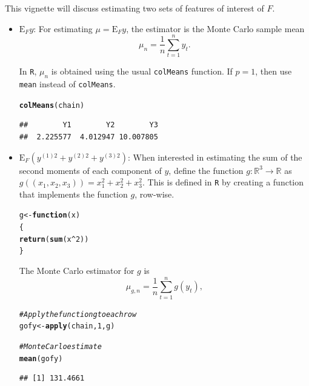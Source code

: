 \documentclass[11pt]{article}\usepackage[]{graphicx}\usepackage[]{color}
\makeatletter
\newcommand{\hlnum}[1]{\textcolor[rgb]{0.686,0.059,0.569}{#1}}%
\newcommand{\hlcom}[1]{\textcolor[rgb]{0.678,0.584,0.686}{\textit{#1}}}%
\newcommand{\hlopt}[1]{\textcolor[rgb]{0,0,0}{#1}}%
\newcommand{\hlstd}[1]{\textcolor[rgb]{0.345,0.345,0.345}{#1}}%
\newcommand{\hlkwa}[1]{\textcolor[rgb]{0.161,0.373,0.58}{\textbf{#1}}}%
\newcommand{\hlkwb}[1]{\textcolor[rgb]{0.69,0.353,0.396}{#1}}%
\newcommand{\hlkwc}[1]{\textcolor[rgb]{0.333,0.667,0.333}{#1}}%
\newcommand{\hlkwd}[1]{\textcolor[rgb]{0.737,0.353,0.396}{\textbf{#1}}}%
\newenvironment{kframe}{%
 \def\at@end@of@kframe{}%
 \ifinner\ifhmode%
  \def\at@end@of@kframe{\end{minipage}}%
  \begin{minipage}{\columnwidth}%
 \fi\fi%
 \def\FrameCommand##1{\hskip\@totalleftmargin \hskip-\fboxsep
 \colorbox{shadecolor}{##1}\hskip-\fboxsep
     \hskip-\linewidth \hskip-\@totalleftmargin \hskip\columnwidth}%
 \MakeFramed {\advance\hsize-\width
   \@totalleftmargin\z@ \linewidth\hsize
   \@setminipage}}%
 {\par\unskip\endMakeFramed%
 \at@end@of@kframe}
\newenvironment{knitrout}{}{} %
\makeatother
\begin{document}
\bigskip
This vignette will discuss estimating two sets of features of interest of $F$.
\begin{itemize}
	\item $\text{E}_F y$: For estimating $\mu = \text{E}_Fy$, the estimator is the Monte Carlo sample mean
\[ \mu_n = \dfrac{1}{n} \displaystyle \sum_{t=1}^{n} y_t.\]

In \texttt{R}, $\mu_n$ is obtained using the usual \texttt{colMeans} function. If $p = 1$, then use \texttt{mean} instead of \texttt{colMeans}.

\begin{knitrout}
\color{fgcolor}\begin{kframe}
\begin{alltt}
 \hlkwd{colMeans}\hlstd{(chain)}
\end{alltt}
\begin{verbatim}
##        Y1        Y2        Y3 
##  2.225577  4.012947 10.007805
\end{verbatim}
\end{kframe}
\end{knitrout}

	\item $\text{E}_F \left(y^{(1)2} + y^{(2)2} + y^{(3)2} \right)$: When interested in estimating the sum of the second moments of each component of $y$,  define the function $g: \mathbb{R}^3 \to \mathbb{R}$ as $g((x_1,x_2,x_3)) = x_1^2 + x_2^2 + x_3^2$. This is defined in \texttt{R} by creating a function that implements the function $g$, row-wise.

\begin{knitrout}
\color{fgcolor}\begin{kframe}
\begin{alltt}
\hlstd{g} \hlkwb{<-} \hlkwa{function}\hlstd{(}\hlkwc{x}\hlstd{)}
\hlstd{\{}
        \hlkwd{return}\hlstd{(}\hlkwd{sum}\hlstd{(x}\hlopt{^}\hlnum{2}\hlstd{))}
\hlstd{\}}
\end{alltt}
\end{kframe}
\end{knitrout}

The Monte Carlo estimator for $g$ is 
\[ \mu_{g,n} = \dfrac{1}{n} \displaystyle \sum_{t=1}^{n} g(y_t),\]

\begin{knitrout}
\color{fgcolor}\begin{kframe}
\begin{alltt}
\hlcom{# Apply the function g to each row}
\hlstd{gofy} \hlkwb{<-} \hlkwd{apply}\hlstd{(chain,} \hlnum{1}\hlstd{, g)}

\hlcom{# Monte Carlo estimate}
\hlkwd{mean}\hlstd{(gofy)}
\end{alltt}
\begin{verbatim}
## [1] 131.4661
\end{verbatim}
\end{kframe}
\end{knitrout}
\end{itemize}
\end{document}
